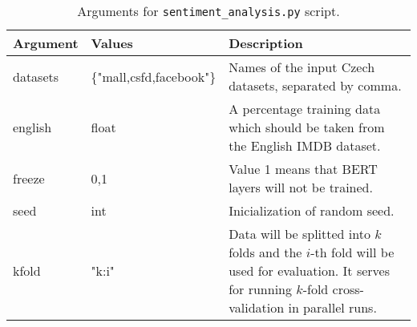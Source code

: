\begin{table}
\centering
\begin{tabular}{ |p{2cm}|p{}|p{6cm}| } 
 \hline
 Argument & Values & Description \\ 
 \hline \hline
 datasets & \{"mall,csfd,facebook"\} &  Names of the input Czech datasets, separated by comma. \\ \hline
 english & float & A percentage training data which should be taken from the English IMDB dataset.\\ \hline
 
 freeze & {0,1} & Value 1 means that BERT layers will not be trained. \\ \hline
 seed & int & Inicialization of random seed. \\ \hline
 kfold & "k:i" & Data will be splitted into $k$ folds and the $i$-th fold will be used for evaluation. It serves for running $k$-fold cross-validation in parallel runs. \\ \hline
 
 \hline
\end{tabular}
\caption{Arguments for \texttt{sentiment\_analysis.py} script.} 
\label{Tab:sent_args}
\end{table}

